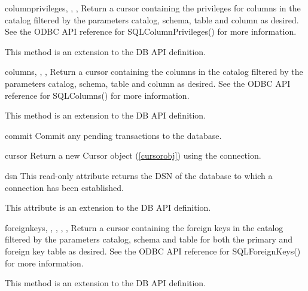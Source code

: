 \documentclass{manual}
\begin{document}
\begin{funcdesc}{columnprivileges}{, ,
    , }
  Return a cursor containing the privileges for columns in the catalog filtered
  by the parameters catalog, schema, table and column as desired. See the ODBC
  API reference for SQLColumnPrivileges() for more information.

   This method is an extension to the DB API definition.
\end{funcdesc}

\begin{funcdesc}{columns}{, ,
    , }
  Return a cursor containing the columns in the catalog filtered by the
  parameters catalog, schema, table and column as desired. See the ODBC API
  reference for SQLColumns() for more information.

   This method is an extension to the DB API definition.
\end{funcdesc}

\begin{funcdesc}{commit}{}
  Commit any pending transactions to the database.
\end{funcdesc}

\begin{funcdesc}{cursor}{}
  Return a new Cursor object (\ref{cursorobj}) using the connection.
\end{funcdesc}

\begin{datadesc}{dsn}
  This read-only attribute returns the DSN of the database to which a
  connection has been established.

   This attribute is an extension to the DB API definition.
\end{datadesc}

\begin{funcdesc}{foreignkeys}{, ,
    , , ,
    }
  Return a cursor containing the foreign keys in the catalog filtered by the
  parameters catalog, schema and table for both the primary and foreign key
  table as desired. See the ODBC API reference for SQLForeignKeys() for more
  information.

   This method is an extension to the DB API definition.
\end{funcdesc}
\end{document}
